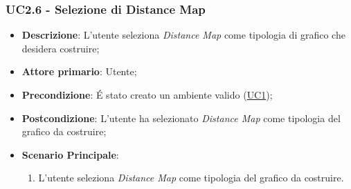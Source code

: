 \subsubsection{UC2.6 - Selezione di Distance Map}
\label{ssub:uc2.6}
\begin{itemize}
	\item \textbf{Descrizione}: L’utente seleziona \emph{Distance Map} come tipologia di grafico che desidera 
	costruire;
	\item \textbf{Attore primario}:	Utente;
	\item \textbf{Precondizione}:	É stato creato un ambiente valido (\hyperref[sub:uc1]{UC1});

    \item \textbf{Postcondizione}:  L'utente ha selezionato \emph{Distance Map} come tipologia del grafico da 
	costruire;

	\item \textbf{Scenario Principale}: 
	\begin{enumerate}
		\item L'utente seleziona \emph{Distance Map} come tipologia del grafico da costruire.
	\end{enumerate}
\end{itemize}
